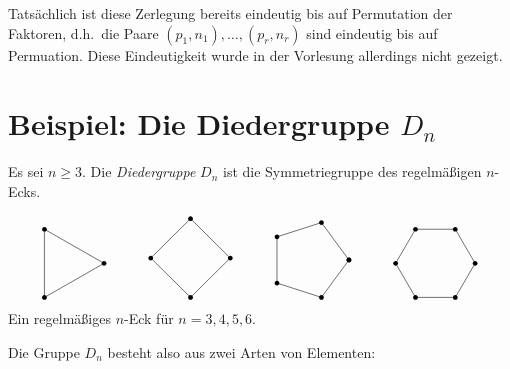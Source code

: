 \begin{remark}
  Tatsächlich ist diese Zerlegung bereits eindeutig bis auf Permutation der Faktoren, d.h.\ die Paare $(p_1, n_1), \dotsc, (p_r, n_r)$ sind eindeutig bis auf Permuation.
  Diese Eindeutigkeit wurde in der Vorlesung allerdings nicht gezeigt.
\end{remark}





\section{Beispiel: Die Diedergruppe \texorpdfstring{$D_n$}{D\_n}}

Es sei $n \geq 3$.
Die \emph{Diedergruppe} $D_n$ ist die Symmetriegruppe des regelmäßigen $n$-Ecks.
\begin{center}
  \[
    \begin{tikzpicture}
      \draw (0:1)
      \foreach \x in {120, 240, 360} {
        -- (\x:1)
      };
      \foreach \x in {120, 240, 360} {
        \fill[black] (\x:1) circle (0.06);
      }
    \end{tikzpicture}
    \hspace{3em}
    \begin{tikzpicture}
      \draw (0:1)
      \foreach \x in {90, 180, 270, 360} {
        -- (\x:1)
      };
      \foreach \x in {90, 180, 270, 360} {
        \fill[black] (\x:1) circle (0.06);
      }
    \end{tikzpicture}
    \hspace{3em}
    \begin{tikzpicture}
      \draw (0:1)
      \foreach \x in {72,144,...,360} {
        -- (\x:1)
      };
      \foreach \x in {0, 72, ..., 360} {
        \fill[black] (\x:1) circle (0.06);
      }
    \end{tikzpicture}
    \hspace{3em}
    \begin{tikzpicture}
      \draw (0:1)
      \foreach \x in {60, 120, ..., 360} {
        -- (\x:1)
      };
      \foreach \x in {60, 120, ..., 360} {
        \fill[black] (\x:1) circle (0.06);
      }
    \end{tikzpicture}
  \]
  Ein regelmäßiges $n$-Eck für $n = 3, 4, 5, 6$.
\end{center}
Die Gruppe $D_n$ besteht also aus zwei Arten von Elementen:
